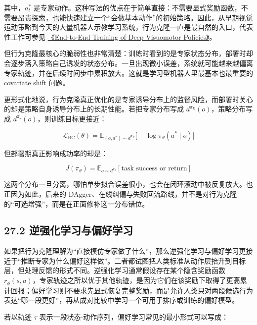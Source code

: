 其中，\(a_t^\ast\) 是专家动作。这种写法的优点在于简单直接：不需要显式奖励函数，不需要昂贵探索，也能快速建立一个“会做基本动作”的初始策略。因此，从早期视觉运动策略到今天的大量机器人示教学习系统，行为克隆一直是最自然的入口，代表性工作可参见 \href{https://arxiv.org/abs/1504.00702}{《End-to-End Training of Deep Visuomotor Policies》}。

但行为克隆最核心的脆弱性也非常清楚：训练时看到的是专家状态分布，部署时却会逐步落入策略自己诱发的状态分布。一旦出现微小误差，系统就可能越来越偏离专家轨迹，并在后续时间步中累积放大。这就是学习型机器人里最基本也最重要的 covariate shift 问题。

更形式化地说，行为克隆真正优化的是专家诱导分布上的监督风险，而部署时关心的却是策略自身诱导分布上的长期性能。若把专家分布写成 \(d^{\pi_E}(o)\)，策略分布写成 \(d^{\pi_\theta}(o)\)，则训练目标更接近：

\begingroup
\scriptsize
\begin{equation*}
\mathcal{L}_{\mathrm{BC}}(\theta)=\mathbb{E}_{(o,a^\ast)\sim d^{\pi_E}}\bigl[-\log \pi_\theta(a^\ast \mid o)\bigr]
\end{equation*}
\endgroup

但部署期真正影响成功率的却是：

\begingroup
\footnotesize
\begin{equation*}
J(\pi_\theta)=\mathbb{E}_{o\sim d^{\pi_\theta}}[\text{task success or return}]
\end{equation*}
\endgroup

这两个分布一旦分离，哪怕单步拟合误差很小，也会在闭环滚动中被反复放大。也正因为如此，后来的 DAgger、在线纠偏与失败回流路线，并不是对行为克隆的“可选增强”，而是在正面修补这一分布错位。

\subsection*{27.2 逆强化学习与偏好学习}


如果把行为克隆理解为“直接模仿专家做了什么”，那么逆强化学习与偏好学习更接近于“推断专家为什么偏好这样做”。二者都试图把人类标准从动作层抬升到目标层，但处理反馈的形式不同。逆强化学习通常假设存在某个隐含奖励函数 \(r_\phi(s, a)\)，专家轨迹之所以优于其他轨迹，是因为它们在该奖励下取得了更高累计回报；偏好学习则不要求先显式恢复完整奖励，而是允许人类只对两段候选行为表达“哪一段更好”，再从成对比较中学习一个可用于排序或训练的偏好模型。

若以轨迹 \(\tau\) 表示一段状态-动作序列，偏好学习常见的最小形式可以写成：

